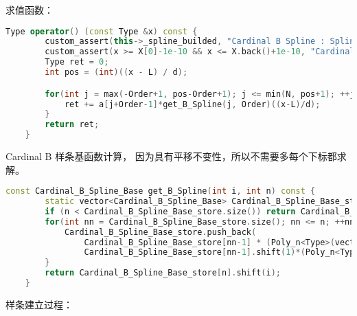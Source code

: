 \documentclass[lang=cn,a4paper,newtx,bibend=bibtex]{elegantpaper}
\begin{document}
求值函数：

\begin{lstlisting}[language=C++]
    Type operator() (const Type &x) const {
		custom_assert(this->_spline_builded, "Cardinal B Spline : Spline have not been built yet.");
        custom_assert(x >= X[0]-1e-10 && x <= X.back()+1e-10, "Cardinal B Spline : Input x is out of range.");
		Type ret = 0;
		int pos = (int)((x - L) / d);

		for(int j = max(-Order+1, pos-Order+1); j <= min(N, pos+1); ++j) {
			ret += a[j+Order-1]*get_B_Spline(j, Order)((x-L)/d);
		}
		return ret;
	}
\end{lstlisting}

Cardinal B 样条基函数计算，
因为具有平移不变性，所以不需要多每个下标都求解。

\begin{lstlisting}[language=C++]
    const Cardinal_B_Spline_Base get_B_Spline(int i, int n) const {
		static vector<Cardinal_B_Spline_Base> Cardinal_B_Spline_Base_store = {Cardinal_B_Spline_Base(0)};
		if (n < Cardinal_B_Spline_Base_store.size()) return Cardinal_B_Spline_Base_store[n].shift(i);
		for(int nn = Cardinal_B_Spline_Base_store.size(); nn <= n; ++nn) {
			Cardinal_B_Spline_Base_store.push_back(
				Cardinal_B_Spline_Base_store[nn-1] * (Poly_n<Type>(vector<Type>({1./nn,1./nn}))) + 
				Cardinal_B_Spline_Base_store[nn-1].shift(1)*(Poly_n<Type>(vector<Type>({1,-1./nn}))));
		}
		return Cardinal_B_Spline_Base_store[n].shift(i);
	}
\end{lstlisting}

样条建立过程：
\end{document}
